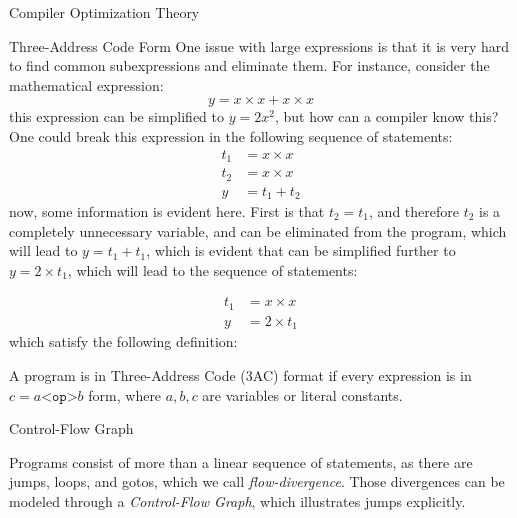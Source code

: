 \begin{section}{Compiler Optimization Theory}
\begin{subsection}{Three-Address Code Form}
One issue with large expressions is that it is very hard to find common
subexpressions and eliminate them. For instance, consider the mathematical
expression:
$$y = x \times x + x \times x $$
this expression can be simplified to $y = 2x^2$, but how
can a compiler know this? One could break this expression in the following
sequence of statements:
\begin{align}
t_1 &= x \times x \nonumber \\
t_2 &= x \times x \nonumber \\
y &= t_1 + t_2 \nonumber
\end{align}
now, some information is evident here. First is that $t_2 = t_1$,
and therefore $t_2$ is a completely unnecessary variable, and can be
eliminated from the program, which will lead to $y = t_1 + t_1$, which is
evident that can be simplified further to $y = 2 \times t_1$, which will lead
to the sequence of statements:

\begin{align}
t_1 &= x \times x \nonumber \\
y &= 2 \times t_1 \nonumber
\end{align}
which satisfy the following definition:
\begin{definition}
	A program is in Three-Address Code (3AC) format if every expression is
	in $c = a \texttt{<op>} b$ form, where $a, b, c$ are variables or
	literal constants.
\end{definition}

\end{subsection}

\begin{subsection}{Control-Flow Graph}

Programs consist of more than a linear sequence of statements, as there are
jumps, loops, and gotos, which we call \textit{flow-divergence}. Those
divergences can be modeled through a \textit{Control-Flow Graph}, which
illustrates jumps explicitly.


\end{subsection}
\end{section}
